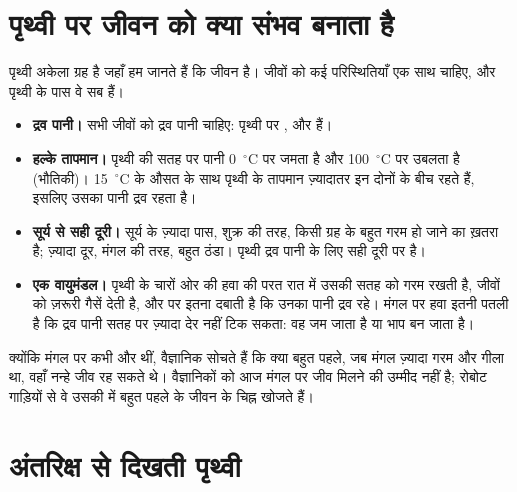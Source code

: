 \section{पृथ्वी पर जीवन को क्या संभव बनाता है}

पृथ्वी अकेला ग्रह है जहाँ हम जानते हैं कि जीवन है। जीवों को कई परिस्थितियाँ एक साथ
चाहिए, और पृथ्वी के पास वे सब हैं।

\begin{itemize}
  \item \textbf{द्रव पानी।} सभी जीवों को द्रव पानी चाहिए: पृथ्वी पर
        ,  और  हैं।
  \item \textbf{हल्के तापमान।} पृथ्वी की सतह पर पानी 0~$^\circ$C पर जमता है
        और 100~$^\circ$C पर उबलता है (भौतिकी)। 15~$^\circ$C के
        औसत के साथ पृथ्वी के तापमान ज़्यादातर इन दोनों के बीच रहते हैं, इसलिए
        उसका पानी द्रव रहता है।
  \item \textbf{सूर्य से सही दूरी।} सूर्य के ज़्यादा पास, शुक्र की तरह, किसी ग्रह के
        बहुत गरम हो जाने का ख़तरा है; ज़्यादा दूर, मंगल की तरह, बहुत
        ठंडा। पृथ्वी द्रव पानी के लिए सही दूरी पर है।
  \item \textbf{एक वायुमंडल।} पृथ्वी के चारों ओर की हवा की परत रात में उसकी
        सतह को गरम रखती है, जीवों को ज़रूरी गैसें देती है, और  पर इतना
        दबाती है कि उनका पानी द्रव रहे। मंगल पर
        हवा इतनी पतली है कि द्रव पानी सतह पर ज़्यादा देर नहीं टिक सकता: वह जम
        जाता है या भाप बन जाता है।
\end{itemize}

\begin{remark}[क्या मंगल पर जीवन था?]\label{rem:g6:earth-a-planet:mars-life}
क्योंकि मंगल पर कभी  और  थीं, वैज्ञानिक सोचते हैं कि क्या बहुत पहले, जब
मंगल ज़्यादा गरम और गीला था, वहाँ नन्हे जीव रह सकते थे।
वैज्ञानिकों को आज मंगल पर जीव मिलने की उम्मीद नहीं है; रोबोट
गाड़ियों से वे उसकी  में बहुत पहले के जीवन के चिह्न खोजते हैं।
\end{remark}

\section{अंतरिक्ष से दिखती पृथ्वी}

